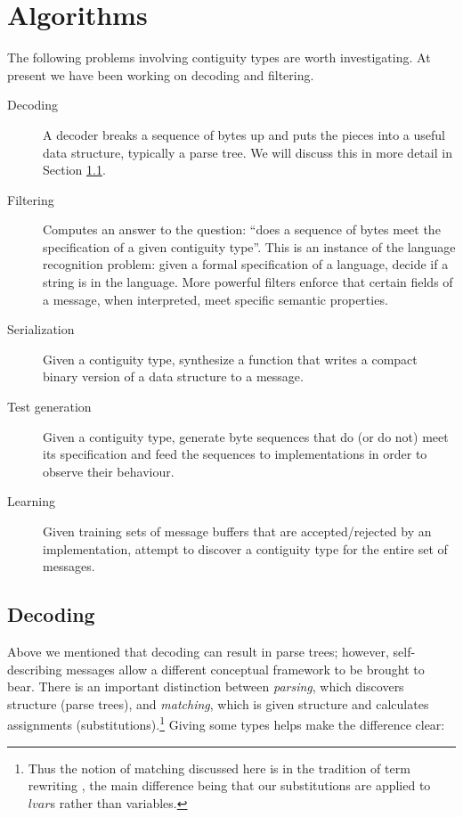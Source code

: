 \documentclass[svgnames]{llncs}
\begin{document}
\section{Algorithms}

The following problems involving contiguity types are worth
investigating. At present we have been working on decoding and
filtering.

\begin{description}

\item [Decoding] A decoder breaks a sequence of bytes up and puts the
  pieces into a useful data structure, typically a parse tree. We will
  discuss this in more detail in Section \ref{decoding}.

\item [Filtering] Computes an answer to the question: ``does a
  sequence of bytes meet the specification of a given contiguity
  type''. This is an instance of the language recognition problem:
  given a formal specification of a language, decide if a string is in
  the language. More powerful filters enforce that certain fields of a
  message, when interpreted, meet specific semantic properties.

\item [Serialization] Given a contiguity type, synthesize a function
  that writes a compact binary version of a data structure to a message.

\item [Test generation] Given a contiguity type, generate byte
  sequences that do (or do not) meet its specification and feed the
  sequences to implementations in order to observe their behaviour.

\item [Learning] Given training sets of message buffers that are
  accepted/rejected by an implementation, attempt to discover a
  contiguity type for the entire set of messages.

\end{description}

\subsection{Decoding}
\label{decoding}

Above we mentioned that decoding can result in parse trees; however,
self-describing messages allow a different conceptual framework to be
brought to bear. There is an important distinction between
\emph{parsing}, which discovers structure (parse trees), and
\emph{matching}, which is given structure and calculates assignments
(substitutions).\footnote{Thus the notion of matching discussed here
  is in the tradition of term rewriting \cite{nipkow-trs-book}, the
  main difference being that our substitutions are applied to
  $\mathit{lvar}$s rather than variables.} Giving some types helps
make the difference clear:
\end{document}
